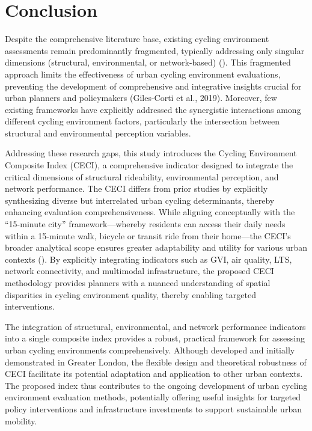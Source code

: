 \documentclass[
  12pt,
  oneside]{book}
\begin{document}
\section{Conclusion}\label{conclusion}

Despite the comprehensive literature base, existing cycling environment assessments remain predominantly fragmented, typically addressing only singular dimensions (structural, environmental, or network-based) (\textcite{muhs_characteristics_2016}). This fragmented approach limits the effectiveness of urban cycling environment evaluations, preventing the development of comprehensive and integrative insights crucial for urban planners and policymakers (Giles-Corti et al., 2019). Moreover, few existing frameworks have explicitly addressed the synergistic interactions among different cycling environment factors, particularly the intersection between structural and environmental perception variables.

Addressing these research gaps, this study introduces the Cycling Environment Composite Index (CECI), a comprehensive indicator designed to integrate the critical dimensions of structural rideability, environmental perception, and network performance. The CECI differs from prior studies by explicitly synthesizing diverse but interrelated urban cycling determinants, thereby enhancing evaluation comprehensiveness. While aligning conceptually with the ``15-minute city'' framework---whereby residents can access their daily needs within a 15-minute walk, bicycle or transit ride from their home---the CECI's broader analytical scope ensures greater adaptability and utility for various urban contexts (\textcite{moreno_introducing_2021}). By explicitly integrating indicators such as GVI, air quality, LTS, network connectivity, and multimodal infrastructure, the proposed CECI methodology provides planners with a nuanced understanding of spatial disparities in cycling environment quality, thereby enabling targeted interventions.

The integration of structural, environmental, and network performance indicators into a single composite index provides a robust, practical framework for assessing urban cycling environments comprehensively. Although developed and initially demonstrated in Greater London, the flexible design and theoretical robustness of CECI facilitate its potential adaptation and application to other urban contexts. The proposed index thus contributes to the ongoing development of urban cycling environment evaluation methods, potentially offering useful insights for targeted policy interventions and infrastructure investments to support sustainable urban mobility.
\end{document}
